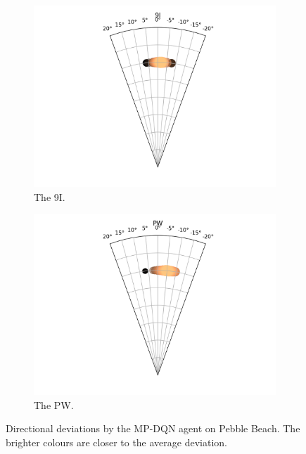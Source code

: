 \documentclass{kththesis}
\begin{document}
\begin{figure}
\begin{subfigure}{0.4\textwidth}
    \centering
    \includegraphics[width=\textwidth]{AgentDirectionChoices/MPDQN_Pebble_Direction_Choices_9I.png} 
    \caption{The 9I.}
    \label{fig:9I_pebble_deviation}
    \end{subfigure}
    \begin{subfigure}{0.4\textwidth}
    \centering
    \includegraphics[width=\textwidth]{AgentDirectionChoices/MPDQN_Pebble_Direction_Choices_PW.png} 
    \caption{The PW.}
    \label{fig:PW_pebble_deviation}
    \end{subfigure}
    \caption{Directional deviations by the MP-DQN agent on Pebble Beach. The brighter colours are closer to the average deviation.}
\end{figure}
\end{document}

